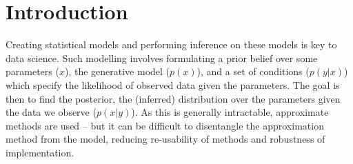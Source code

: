 \documentclass[sigconf]{acmart}
\begin{document}



\maketitle

\section{Introduction}
\label{s:introduction}

Creating statistical models and performing inference on these models is key to data science. Such modelling involves formulating a prior belief over some parameters ($x$), the generative model ($p(x)$), and a set of conditions ($p(y|x)$) which specify the likelihood of observed data given the parameters. The goal is then to find the posterior, the (inferred) distribution over the parameters given the data we observe ($p(x|y)$). As this is generally intractable, approximate methods are used -- but it can be difficult to disentangle the approximation method from the model, reducing re-usability of methods and robustness of implementation.
\end{document}
